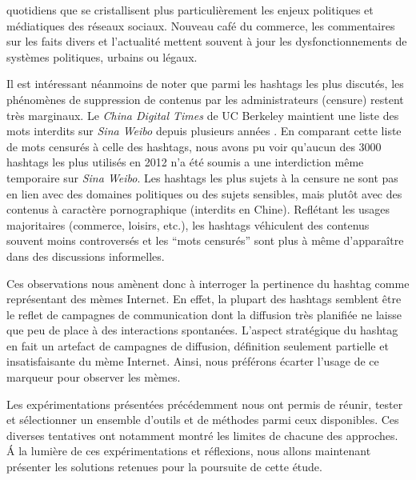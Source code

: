 quotidiens que se cristallisent plus particulièrement les enjeux politiques et médiatiques des réseaux sociaux. Nouveau café du commerce, les commentaires sur les faits divers et l{\textquoteright}actualité mettent souvent à jour les dysfonctionnements de systèmes politiques, urbains ou légaux. 

Il est intéressant néanmoins de noter que parmi les hashtags les plus discutés, les phénomènes de suppression de contenus par les administrateurs (censure) restent très marginaux. Le \textit{China Digital Times} de UC Berkeley maintient une liste des mots interdits sur \textit{Sina Weibo} depuis plusieurs années \citep{Ng2013}. En comparant cette liste de mots censurés à celle des hashtags, nous avons pu voir qu{\textquoteright}aucun des 3000 hashtags les plus utilisés en 2012 n{\textquoteright}a été soumis a une interdiction m\^eme temporaire sur \textit{Sina Weibo}. Les hashtags les plus sujets à la censure ne sont pas en lien avec des domaines politiques ou des sujets sensibles, mais plut\^ot avec des contenus à caractère pornographique (interdits en Chine). Reflétant les usages majoritaires (commerce, loisirs, etc.), les hashtags véhiculent des contenus souvent moins controversés et les {\textquotedblleft}mots censurés{\textquotedblright} sont plus à m\^eme d{\textquoteright}appara\^itre dans des discussions informelles.

Ces observations nous amènent donc à interroger la pertinence du hashtag comme représentant des mèmes Internet. En effet, la plupart des hashtags semblent être le reflet de campagnes de communication dont la diffusion très planifiée ne laisse que peu de place à des interactions spontanées. L'aspect stratégique du hashtag en fait un artefact de campagnes de diffusion, définition seulement partielle et insatisfaisante du mème Internet.  Ainsi, nous préférons écarter l'usage de ce marqueur pour observer les mèmes.

\bigskip

Les expérimentations présentées précédemment nous ont permis de réunir, tester et sélectionner un ensemble d'outils et de méthodes parmi ceux disponibles. Ces diverses tentatives ont notamment montré les limites de chacune des approches. \'A la lumière de ces expérimentations et réflexions, nous allons maintenant présenter les solutions retenues pour la poursuite de cette étude.